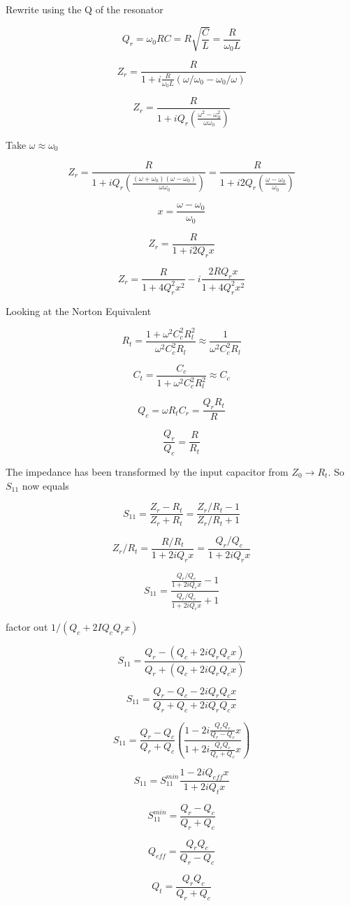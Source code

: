 \documentclass[12pt]{article}
\begin{document}
Rewrite using the Q of the resonator

\[
Q_r = \omega_0 R C = R \sqrt{\frac{C}{L}} = \frac{R}{\omega_0 L}
\]

\[
Z_r = \frac{R}{1 + i \frac{R}{\omega_0 L}(\omega/\omega_0 - \omega_0/\omega)}
\]

\[
Z_r = \frac{R}{1 + iQ_r(\frac{\omega^2 - \omega_0^2}{\omega \omega_0})}
\]

Take $\omega \approx \omega_0$

\[
Z_r = \frac{R}{1 + iQ_r(\frac{(\omega + \omega_0)(\omega - \omega_0)}{\omega \omega_0})} = \frac{R}{1 + i2 Q_r(\frac{\omega - \omega_0}{\omega_0})}
\]

\[
x = \frac{\omega - \omega_0}{\omega_0}
\]

\[
Z_r = \frac{R}{1 +i 2 Q_r x}
\]

\[
Z_r = \frac{R}{1 + 4 Q_r^2 x^2} - i \frac{ 2 R Q_r x}{1 + 4 Q_r^2 x^2}
\]

Looking at the Norton Equivalent

\[
R_t = \frac{1+ \omega^2 C_c^2 R_l^2}{\omega^2 C_c^2 R_l} \approx \frac{1}{\omega^2 C_c^2 R_l}
\]

\[
C_t  = \frac{ C_c}{1 + \omega^2 C_c^2 R_l^2} \approx C_c
\]

\[
Q_c = \omega R_t C_r = \frac{Q_r R_t}{R}
\]

\[
\frac{Q_r}{Q_c} = \frac{R}{R_t}
\]

The impedance has been transformed by the input capacitor from $Z_0 \rightarrow R_t$. So $S_{11}$ now equals

\[
S_{11} = \frac{Z_r - R_t}{Z_r + R_t} = \frac{ Z_r/R_t - 1}{Z_r/R_t + 1}
\]

\[
Z_r/R_t = \frac{R/R_t}{1 + 2iQ_r x} = \frac{Q_r/Q_c}{1 + 2i Q_r x}
\]

\[
S_{11} = \frac{\frac{Q_r/Q_c}{1 + 2i Q_r x} - 1}{\frac{Q_r/Q_c}{1 + 2i Q_r x} + 1}
\]

factor out $1/(Q_c + 2I Q_c Q_r x)$

\[
S_{11} = \frac{ Q_r - (Q_c + 2i Q_r Q_c x)}{Q_r + (Q_c + 2i Q_r Q_c x)}
\] 

\[
S_{11} = \frac{ Q_r - Q_c - 2i Q_r Q_c x}{Q_r + Q_c + 2i Q_r Q_c x}
\]


\[
S_{11} = \frac{Q_r - Q_c}{Q_r + Q_c} \left(\frac{1 - 2i \frac{Q_r Q_c}{Q_r - Q_c} x}{1 + 2i \frac{Q_r Q_c}{Q_r + Q_c}x}\right)
\]

\[
S_{11} = S_{11}^{min} \frac{1 - 2i Q_{eff} x}{1 + 2i Q_{t} x}
\]

\[
S_{11}^{min} =  \frac{Q_r - Q_c}{Q_r + Q_c} 
\]

\[
Q_{eff} = \frac{Q_r Q_c}{Q_r - Q_c}
\]

\[
Q_t = \frac{Q_r Q_c}{Q_r + Q_c}
\]
\end{document}
